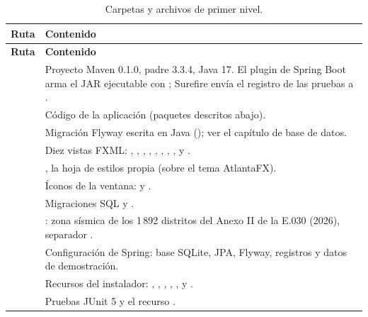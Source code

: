 \begin{longtable}{L{6.2cm}L{8.6cm}}
	\caption{Carpetas y archivos de primer nivel.} \label{tab:est-raiz} \\
	\hline
	\textbf{Ruta} & \textbf{Contenido} \\ \hline
	\endfirsthead
	\hline
	\textbf{Ruta} & \textbf{Contenido} \\ \hline
	\endhead
	\hline
	\endfoot
	 & Proyecto Maven  0.1.0, padre  3.3.4,
	Java 17. El plugin de Spring Boot arma el JAR ejecutable con ; Surefire envía el
	registro de las pruebas a . \\
	 & Código de la aplicación (paquetes descritos abajo). \\
	 & Migración Flyway escrita en Java (); ver
	el capítulo de base de datos. \\
	 & Diez vistas FXML: , , ,
	, , , ,
	,  y . \\
	 & , la hoja de estilos propia (sobre el tema AtlantaFX). \\
	 & Íconos de la ventana:  y . \\
	 & Migraciones SQL  y . \\
	 & : zona sísmica de los 1\,892 distritos del
	Anexo II de la E.030 (2026), separador \ruta{;}. \\
	 & Configuración de Spring: base SQLite, JPA, Flyway, registros y
	datos de demostración. \\
	 & Recursos del instalador: , ,
	, , ,  y
	. \\
	 & Pruebas JUnit 5 y el recurso . \\

\end{longtable}
